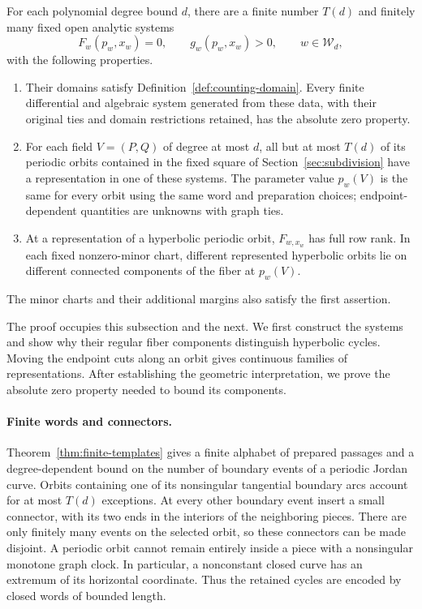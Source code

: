 \begin{theorem}\label{thm:matching-system}
For each polynomial degree bound $d$, there are a finite number $T(d)$
and finitely many fixed open analytic systems
\[
 F_w(p_w,x_w)=0,\qquad g_w(p_w,x_w)>0,
 \qquad w\in\mathcal W_d,
\]
with the following properties.
\begin{enumerate}
\item Their domains satisfy Definition~\ref{def:counting-domain}.
Every finite differential and algebraic system generated from these
data, with their original ties and domain restrictions retained, has
the absolute zero property.
\item For each field $V=(P,Q)$ of degree at most $d$, all but at most
$T(d)$ of its periodic orbits contained in the fixed square of
Section~\ref{sec:subdivision} have a representation in one of these
systems.  The parameter value $p_w(V)$ is the same for every orbit
using the same word and preparation choices; endpoint-dependent
quantities are unknowns with graph ties.
\item At a representation of a hyperbolic periodic orbit, $F_{w,x_w}$
has full row rank.  In each fixed nonzero-minor chart, different
represented hyperbolic orbits lie on different connected components
of the fiber at $p_w(V)$.
\end{enumerate}
The minor charts and their additional margins also satisfy the first
assertion.
\end{theorem}

The proof occupies this subsection and the next.  We first construct the
systems and show why their regular fiber components distinguish hyperbolic
cycles.  Moving the endpoint cuts along an orbit gives continuous families of
representations.  After
establishing the geometric interpretation, we prove the absolute zero
property needed to bound its components.

\paragraph{Finite words and connectors.}
Theorem~\ref{thm:finite-templates} gives a finite alphabet of prepared
passages and a degree-dependent bound on the number of boundary
events of a periodic Jordan curve.  Orbits containing one of its
nonsingular tangential boundary arcs account for at most $T(d)$
exceptions.  At every other boundary event insert a small connector,
with its two ends in the interiors of the neighboring pieces.
There are only finitely many events on the selected orbit, so these
connectors can be made disjoint.  A periodic orbit cannot remain
entirely inside a piece with a nonsingular monotone graph clock.
In particular, a nonconstant closed curve has an extremum of its
horizontal coordinate.  Thus the retained cycles are encoded by
closed words of bounded length.

